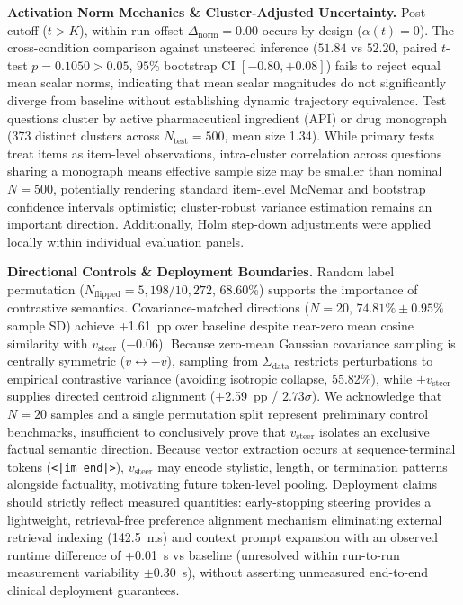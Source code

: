\documentclass[runningheads]{llncs}
\begin{document}
\textbf{Activation Norm Mechanics \& Cluster-Adjusted Uncertainty.} Post-cutoff ($t > K$), within-run offset $\Delta_{\text{norm}} = 0.00$ occurs by design ($\alpha(t)=0$). The cross-condition comparison against unsteered inference ($51.84$ vs $52.20$, paired $t$-test $p=0.1050 > 0.05$, $95\%$ bootstrap CI $[-0.80, +0.08]$) fails to reject equal mean scalar norms, indicating that mean scalar magnitudes do not significantly diverge from baseline without establishing dynamic trajectory equivalence. Test questions cluster by active pharmaceutical ingredient (API) or drug monograph (373 distinct clusters across $N_{\text{test}}=500$, mean size 1.34). While primary tests treat items as item-level observations, intra-cluster correlation across questions sharing a monograph means effective sample size may be smaller than nominal $N=500$, potentially rendering standard item-level McNemar and bootstrap confidence intervals optimistic; cluster-robust variance estimation remains an important direction. Additionally, Holm step-down adjustments were applied locally within individual evaluation panels.

\textbf{Directional Controls \& Deployment Boundaries.} Random label permutation ($N_{\text{flipped}}=5,198/10,272$, 68.60\%) supports the importance of contrastive semantics. Covariance-matched directions ($N=20$, $74.81\% \pm 0.95\%$ sample SD) achieve +1.61~pp over baseline despite near-zero mean cosine similarity with $v_{\text{steer}}$ ($-0.06$). Because zero-mean Gaussian covariance sampling is centrally symmetric ($v \leftrightarrow -v$), sampling from $\Sigma_{\text{data}}$ restricts perturbations to empirical contrastive variance (avoiding isotropic collapse, 55.82\%), while $+v_{\text{steer}}$ supplies directed centroid alignment (+2.59~pp / $2.73\sigma$). We acknowledge that $N=20$ samples and a single permutation split represent preliminary control benchmarks, insufficient to conclusively prove that $v_{\text{steer}}$ isolates an exclusive factual semantic direction. Because vector extraction occurs at sequence-terminal tokens (\texttt{<|im\_end|>}), $v_{\text{steer}}$ may encode stylistic, length, or termination patterns alongside factuality, motivating future token-level pooling. Deployment claims should strictly reflect measured quantities: early-stopping steering provides a lightweight, retrieval-free preference alignment mechanism eliminating external retrieval indexing (142.5~ms) and context prompt expansion with an observed runtime difference of +0.01~s vs baseline (unresolved within run-to-run measurement variability $\pm 0.30$~s), without asserting unmeasured end-to-end clinical deployment guarantees.
\end{document}
